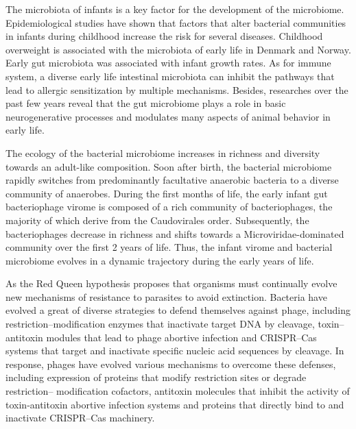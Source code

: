 \documentclass[a4paper]{article}
\theoremstyle{definition}
\numberwithin{equation}{section}
\begin{document}
The microbiota of infants is a key factor for the development of the microbiome\citep{stewart2018temporal}. Epidemiological studies have shown that factors that alter bacterial communities in infants during childhood increase the risk for several diseases\citep{tamburini2016microbiome}. Childhood overweight is associated with the microbiota of early life in Denmark\citep{ajslev2011childhood} and Norway\citep{stanislawski2018gut}. Early gut microbiota was associated with infant growth rates.\citep{white2013novel} As for immune system, a diverse early life intestinal microbiota can inhibit the pathways that lead to allergic sensitization by multiple mechanisms\citep{reynolds2017early}. Besides, researches over the past few years reveal that the gut microbiome plays a role in basic neurogenerative processes and modulates many aspects of animal behavior in early life\citep{sharon2016central}.

The ecology of the bacterial microbiome increases in richness and diversity towards an adult-like composition\citep{yatsunenko2012human}. Soon after birth, the bacterial microbiome rapidly switches from predominantly facultative anaerobic bacteria to a diverse community of anaerobes\citep{koenig2011succession}. During the first months of life, the early infant gut bacteriophage virome is composed of a rich community of bacteriophages, the majority of which derive from the Caudovirales order. Subsequently, the bacteriophages decrease in richness and shifts towards a Microviridae-dominated community over the first 2 years of life. Thus, the infant virome and bacterial microbiome evolves in a dynamic trajectory during the early years of life\citep{lim2015early}.

As the Red Queen hypothesis proposes that organisms must continually evolve new mechanisms of resistance to parasites to avoid extinction\citep{liow2011red}. Bacteria have evolved a great of diverse strategies to defend themselves against phage, including restriction–modification enzymes that inactivate target DNA by cleavage, toxin–antitoxin modules that lead to phage abortive infection and CRISPR–Cas systems that target and inactivate specific nucleic acid sequences by cleavage. In response, phages have evolved various mechanisms to overcome these defenses, including expression of proteins that modify restriction sites\citep{kruger1983bacteriophage} or degrade restriction– modification cofactors\citep{studier1976samase}, antitoxin molecules that inhibit the activity of toxin‑antitoxin abortive infection systems\citep{otsuka2012dmd} and proteins that directly bind to and inactivate CRISPR–Cas machinery\citep{pawluk2016naturally}.
\end{document}
